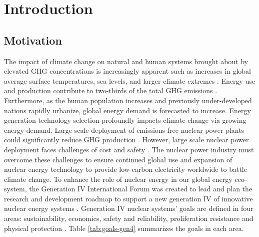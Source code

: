 \chapter{Introduction}
\label{chap:intro}


\section{Motivation}
The impact of climate change on natural and human systems brought about by 
elevated \gls{GHG} concentrations is increasingly apparent such as increases 
in global average surface temperatures, sea levels, and larger climate extremes 
\cite{noauthor_climate_2018}.
Energy use and production contribute to two-thirds of the total \gls{GHG}
emissions \cite{noauthor_climate_2018}.
Furthermore, as the human population increases and previously under-developed 
nations rapidly urbanize, global energy demand is forecasted to increase.  
Energy generation technology selection profoundly impacts climate change via 
growing energy demand. 
Large scale deployment of emissions-free nuclear power plants could 
significantly reduce GHG production \cite{noauthor_climate_2018}.  
However, large scale nuclear power deployment faces challenges of cost and 
safety \cite{petti_future_2018}. 
The nuclear power industry must overcome these challenges to ensure continued 
global use and expansion of nuclear energy technology to provide low-carbon 
electricity worldwide to battle climate change.
To enhance the role of nuclear energy in our global energy 
eco-system, the Generation IV International Forum was created to lead and plan 
the research and development roadmap to support a new generation IV of innovative 
nuclear energy systems \cite{gif_technology_2002}.
Generation IV nuclear systems' goals are defined in four areas: sustainability, 
economics, safety and reliability, proliferation resistance and physical 
protection \cite{gif_technology_2002}. 
Table \ref{tab:goals-gen4} summarizes the goals in each area. 


